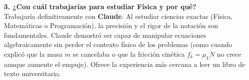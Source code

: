 \documentclass[11pt]{article}
\begin{document}
\vspace{0.3cm}
\textbf{3. ¿Con cuál trabajarías para estudiar Física y por qué?} \\
Trabajaría definitivamente con \textbf{Claude}. Al estudiar ciencias exactas (Física, Matemáticas o Programación), la precisión y el rigor de la notación son fundamentales. Claude demostró ser capaz de manipular ecuaciones algebraicamente sin perder el contexto físico de los problemas (como cuando explicó que la masa $m$ se cancelaba o que la fricción cinética $f_k = \mu_k N$ no crece aunque aumente el empuje). Ofrece la experiencia más cercana a leer un libro de texto universitario.
\end{document}
